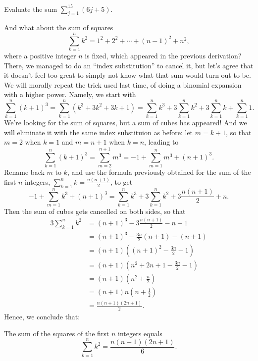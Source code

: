 \documentclass[nooutcomes]{ximera}
\begin{document}
\begin{exploration}
  Evaluate the sum $\sum_{j=1}^{15} (6j+5)$.
\end{exploration}


And what about the sum of squares $$\sum_{k=1}^n k^2 = 1^2+2^2+\cdots + (n-1)^2 + n^2,$$where a positive integer $n$ is fixed,  which appeared in the previous derivation? There, we managed to do an ``index substitution'' to cancel it, but let's agree that it doesn't feel too great to simply not know what that sum would turn out to be. We will morally repeat the trick used last time, of doing a binomial expansion with a higher power. Namely, we start with $$\sum_{k=1}^n (k+1)^3 = \sum_{k=1}^n (k^3+3k^2+3k+1) = \sum_{k=1}^n k^3+3\sum_{k=1}^nk^2+3\sum_{k=1}^n k + \sum_{k=1}^n1.$$We're looking for the sum of squares, but a sum of cubes has appeared! And we will eliminate it with the same index substituion as before: let $m=k+1$, so that $m=2$ when $k=1$ and $m=n+1$ when $k=n$, leading to $$\sum_{k=1}^n (k+1)^3 = \sum_{m=2}^{n+1}m^3 = -1+\sum_{m=1}^nm^3 + (n+1)^3.$$Rename back $m$ to $k$, and use the formula previously obtained for the sum of the first $n$ integers, $\sum_{k=1}^nk=\frac{n(n+1)}{2}$, to get $$-1+\sum_{m=1}^nk^3 + (n+1)^3 = \sum_{k=1}^nk^3 + 3\sum_{k=1}^nk^2 + 3\frac{n(n+1)}{2} + n.$$Then the sum of cubes gets cancelled on both sides, so that
\begin{align*}
  3\sum_{k=1}^n k^2 &= (n+1)^3-3\frac{n(n+1)}{2}-n-1 \\ &= (n+1)^3 - \frac{3n}{2}(n+1) - (n+1) \\ &= (n+1)\left((n+1)^2 - \frac{3n}{2} -1\right) \\ &= (n+1)\left(n^2+2n+1-\frac{3n}{2}-1\right) \\ &= (n+1)\left(n^2+\frac{n}{2}\right) \\ &= (n+1)n\left(n+\frac{1}{2}\right) \\ &= \frac{n(n+1)(2n+1)}{2}.
\end{align*}Hence, we conclude that:
\begin{callout}
The sum of the squares of the first $n$ integers equals $$\sum_{k=1}^n k^2 = \frac{n(n+1)(2n+1)}{6}.$$  
\end{callout}
\end{document}
